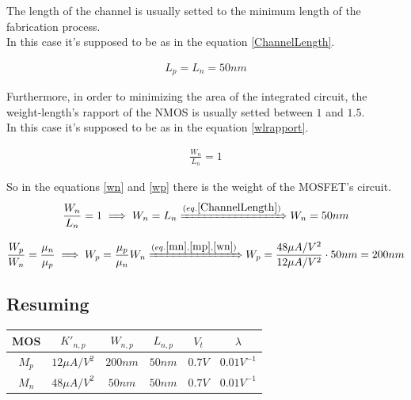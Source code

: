The length of the channel is usually setted to the minimum length of the fabrication process.\\
In this case it's supposed to be as in the equation \ref{ChannelLength}.\par
\begin{align}
L_p = L_n = 50 nm \label{ChannelLength}
\end{align}

Furthermore, in order to minimizing the area of the integrated circuit, the weight-length's rapport of the NMOS is usually setted between $1$ and $1.5$.\\
In this case it's supposed to be as in the equation \ref{wlrapport}. \par
\begin{align}
\frac{W_n}{L_n} = 1 \label{wlrapport}
\end{align}

So in the equations \ref{wn} and \ref{wp} there is the weight of the MOSFET's circuit.\\

\begin{align}
\frac{W_n}{L_n} = 1 \implies W_n = L_n \xRightarrow{(eq. \ref{ChannelLength})} W_n = 50nm \label{wn}
\end{align} 

\begin{align}
\frac{W_p}{W_n} = \frac{\mu _n}{\mu _p} \implies W_p = \frac{\mu _p}{\mu _n}W_n \xRightarrow{(eq. \ref{mn}, \ref{mp}, \ref{wn})} W_p = \frac{48 \mu A / V^2}{12 \mu A / V^2} \cdot 50nm = 200nm \label{wp}
\end{align}

\subsection{Resuming}\label{MOSProperties}
\begin{center}
\begin{tabular}{|c|c|c|c|c|c|}
\hline
MOS & $K'_{n,p}$ & $W_{n,p}$ & $L_{n,p}$ & $V_t$ & $\lambda$\\
\hline
$M_p$ & $12 \mu A / V^2$ & $200nm$ & $50nm$ & $0.7V$ & $0.01 V^{-1}$\\
$M_n$ & $48 \mu A / V^2$ & $50nm$ & $50nm$ & $0.7V$ & $0.01 V^{-1}$\\
\hline
\end{tabular}
\end{center}

